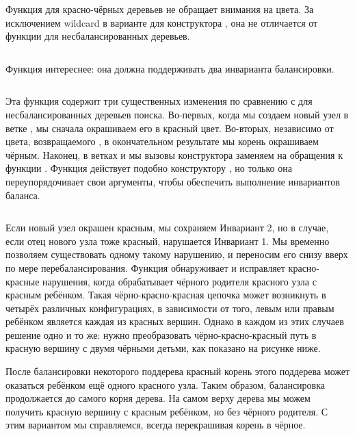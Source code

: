 \begin{frame}[fragile]{}
Функция  для красно-чёрных деревьев не обращает
внимания на цвета. За исключением wildcard в варианте для конструктора
, она не отличается от функции  для
несбалансированных деревьев.
\inputminted[firstline=18,lastline=21] {haskell}{code/RedBlackSet.lhs}
\end{frame}


\begin{frame}[fragile]{}
Функция  интереснее: она должна
поддерживать два инварианта балансировки.

\inputminted[firstline=23,lastline=29] {haskell}{code/RedBlackSet.lhs}

Эта функция содержит три существенных изменения по сравнению с  для
несбалансированных деревьев поиска. Во-первых, когда мы создаем новый
узел в ветке , мы сначала окрашиваем его в красный
цвет. Во-вторых, независимо от цвета, возвращаемого ,
в окончательном результате мы корень окрашиваем чёрным. Наконец, в
ветках  и  мы вызовы конструктора
 заменяем на обращения к функции
. Функция  действует подобно
конструктору , но только она переупорядочивает свои
аргументы, чтобы обеспечить выполнение инвариантов баланса.
\end{frame}


\begin{frame}[fragile]{}
\inputminted[firstline=9,lastline=13] {haskell}{code/RedBlackSet.lhs}

Если новый узел окрашен красным, мы сохраняем Инвариант 2, но в
случае, если отец нового узла тоже красный, нарушается Инвариант 1. Мы
временно позволяем существовать одному такому нарушению, и переносим
его снизу вверх по мере перебалансирования. Функция
 обнаруживает и исправляет красно-красные нарушения,
когда обрабатывает чёрного родителя красного узла с красным
ребёнком. Такая чёрно-красно-красная цепочка может возникнуть в
четырёх различных конфигурациях, в зависимости от того, левым или
правым ребёнком является каждая из красных вершин. Однако в каждом из
этих случаев решение одно и то же: нужно преобразовать
чёрно-красно-красный путь в красную вершину с двумя чёрными детьми,
как показано на рисунке ниже.
\end{frame}


\begin{frame}[fragile]{}
После балансировки некоторого поддерева красный корень этого поддерева
может оказаться ребёнком ещё одного красного узла. Таким образом,
балансировка продолжается до самого корня дерева. На самом верху
дерева мы можем получить красную вершину с красным ребёнком, но без
чёрного родителя. С этим вариантом мы справляемся, всегда перекрашивая корень
в чёрное.

\end{frame}


